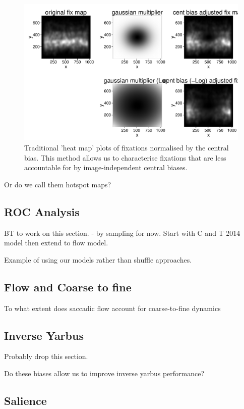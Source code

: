 \documentclass[a4paper, onecolumn, oneside, 11pt]{article}
\begin{document}
\begin{figure}
\includegraphics[width=\textwidth]{../scripts/heatmaps/centreadjustedheatmaps.pdf}
\caption{Traditional 'heat map' plots of fixations normalised by the central bias. This method allows us to characterise fixations that are less accountable for by image-independent central biases.}
\label{fig:centreAdjustedHeatmaps}
\end{figure}

Or do we call them hotspot maps?

\subsection{ROC Analysis}

BT to work on this section.
 - by sampling for now. Start with C and T 2014 model then extend to flow model.

Example of using our models rather than shuffle approaches.

\subsection{Flow and Coarse to fine}
To what extent does saccadic flow account for coarse-to-fine dynamics

\subsection{Inverse Yarbus}

Probably drop this section.

Do these biases allow us to improve inverse yarbus performance?

\subsection{Salience}
\end{document}
